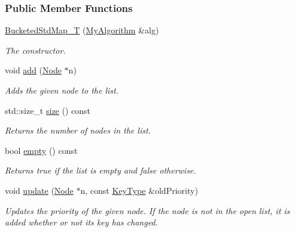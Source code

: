 \subsubsection*{Public Member Functions}
\begin{DoxyCompactItemize}
\item 
\hyperlink{structslb_1_1ext_1_1policy_1_1openList_1_1BucketedStdMap__T_a833535b9d82b91e30110758b6bd919ce}{Bucketed\+Std\+Map\+\_\+T} (\hyperlink{structslb_1_1ext_1_1policy_1_1openList_1_1BucketedStdMap__T_abe8c12b881c4c3440e5b5e3aaa72c061}{My\+Algorithm} \&alg)
\begin{DoxyCompactList}\small\item\em The constructor. \end{DoxyCompactList}\item 
void \hyperlink{structslb_1_1ext_1_1policy_1_1openList_1_1BucketedStdMap__T_aa6260761891f8b1db92a3462acb49477}{add} (\hyperlink{structslb_1_1ext_1_1policy_1_1openList_1_1BucketedStdMap__T_a20be12bd955d752d2ef9e78f7577c738}{Node} $\ast$n)
\begin{DoxyCompactList}\small\item\em Adds the given node to the list. \end{DoxyCompactList}\item 
std\+::size\+\_\+t \hyperlink{structslb_1_1ext_1_1policy_1_1openList_1_1BucketedStdMap__T_a2ec989f91f4d84552d4c100bb79a007d}{size} () const 
\begin{DoxyCompactList}\small\item\em Returns the number of nodes in the list. \end{DoxyCompactList}\item 
bool \hyperlink{structslb_1_1ext_1_1policy_1_1openList_1_1BucketedStdMap__T_a091538972fdbdcb9ab0e833b62f7115f}{empty} () const 
\begin{DoxyCompactList}\small\item\em Returns {\ttfamily true} if the list is empty and {\ttfamily false} otherwise. \end{DoxyCompactList}\item 
void \hyperlink{structslb_1_1ext_1_1policy_1_1openList_1_1BucketedStdMap__T_a05bb2fdd5ed53f34ee9f44209147028a}{update} (\hyperlink{structslb_1_1ext_1_1policy_1_1openList_1_1BucketedStdMap__T_a20be12bd955d752d2ef9e78f7577c738}{Node} $\ast$n, const \hyperlink{structslb_1_1ext_1_1policy_1_1openList_1_1BucketedStdMap__T_a1236fe314465155339798c0f9c4c5ca8}{Key\+Type} \&old\+Priority)
\begin{DoxyCompactList}\small\item\em Updates the priority of the given node. If the node is not in the open list, it is added whether or not it\textquotesingle{}s key has changed. \end{DoxyCompactList}\item 

\end{DoxyCompactItemize}
